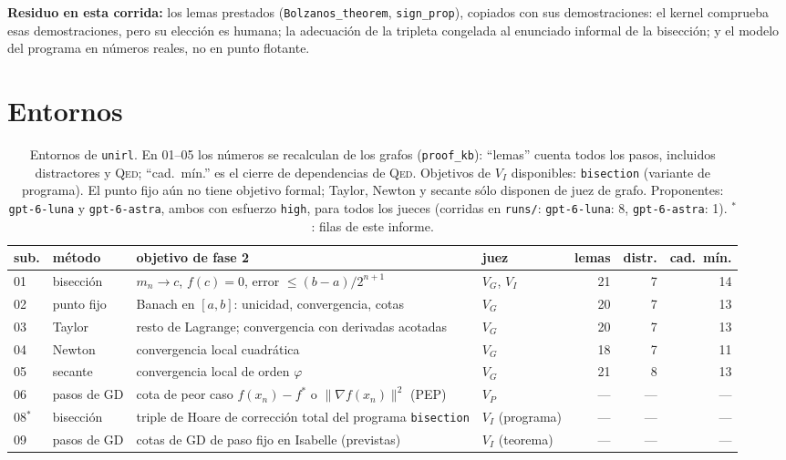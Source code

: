 \documentclass[11pt,a4paper]{article}
\begin{document}
\textbf{Residuo en esta corrida:} los lemas prestados (\texttt{Bolzanos\_\allowbreak{}theorem}, \texttt{sign\_\allowbreak{}prop}), copiados con sus demostraciones: el kernel comprueba esas demostraciones, pero su elección es humana; la adecuación de la tripleta congelada al enunciado informal de la bisección; y el modelo del programa en números reales, no en punto flotante.

\section{Entornos}

\begin{table}[!ht]
\centering
\footnotesize
\begin{tabular}{@{}llp{5.0cm}lrrr@{}}
\toprule
sub. & método & objetivo de fase 2 & juez & lemas & distr. & cad.\ mín. \\
\midrule
01 & bisección & $m_n \to c$, $f(c)=0$, error $\le (b-a)/2^{n+1}$ & $V_G$, $V_I$ & 21 & 7 & 14 \\
02 & punto fijo & Banach en $[a,b]$: unicidad, convergencia, cotas & $V_G$ & 20 & 7 & 13 \\
03 & Taylor & resto de Lagrange; convergencia con derivadas acotadas & $V_G$ & 20 & 7 & 13 \\
04 & Newton & convergencia local cuadrática & $V_G$ & 18 & 7 & 11 \\
05 & secante & convergencia local de orden $\varphi$ & $V_G$ & 21 & 8 & 13 \\
06 & pasos de GD & cota de peor caso $f(x_n)-f^*$ o $\|\nabla f(x_n)\|^2$ (PEP) & $V_P$ & --- & --- & --- \\
08$^\ast$ & bisección & triple de Hoare de corrección total del programa \texttt{bisection} & $V_I$ (programa) & --- & --- & --- \\
09 & pasos de GD & cotas de GD de paso fijo en Isabelle (previstas) & $V_I$ (teorema) & --- & --- & --- \\
\bottomrule
\end{tabular}
\caption{Entornos de \texttt{unirl}. En 01--05 los números se recalculan de los grafos (\texttt{proof\_kb}): ``lemas'' cuenta todos los pasos, incluidos distractores y \textsc{Qed}; ``cad.\ mín.'' es el cierre de dependencias de \textsc{Qed}. Objetivos de $V_I$ disponibles: \texttt{bisection} (variante de programa). El punto fijo aún no tiene objetivo formal; Taylor, Newton y secante sólo disponen de juez de grafo. Proponentes: \texttt{gpt-6-luna} y \texttt{gpt-6-astra}, ambos con esfuerzo \texttt{high}, para todos los jueces (corridas en \texttt{runs/}: \texttt{gpt-\allowbreak{}6-\allowbreak{}luna}: 8, \texttt{gpt-\allowbreak{}6-\allowbreak{}astra}: 1). $^\ast$: filas de este informe.}
\label{tab:envs}
\end{table}
\end{document}
